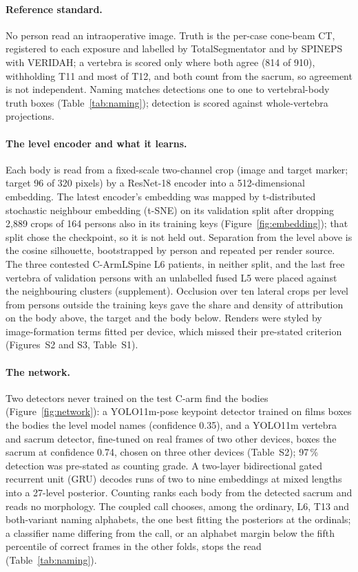 \paragraph{Reference standard.}
No person read an intraoperative image. Truth is the per-case cone-beam CT, registered to each exposure and
labelled by TotalSegmentator and by SPINEPS with VERIDAH; a vertebra is scored only where both agree (814 of
910), withholding T11 and most of T12, and both count from the sacrum, so agreement is not independent. Naming matches detections one to one to vertebral-body truth boxes
(Table~\ref{tab:naming}); detection is scored against whole-vertebra projections.

\paragraph{The level encoder and what it learns.}
Each body is read from a fixed-scale two-channel crop (image and target marker; target 96 of 320 pixels) by a
ResNet-18 encoder \citep{he2016} into a 512-dimensional embedding. The latest encoder's embedding was mapped by
t-distributed stochastic neighbour embedding (t-SNE) on its validation split after dropping 2,889 crops of 164
persons also in its training keys (Figure~\ref{fig:embedding}); that split chose the checkpoint, so it is not
held out. Separation from the level above is the cosine silhouette, bootstrapped by person and repeated per
render source. The three contested C-ArmLSpine L6 patients, in neither split, and the last free vertebra
of validation persons with an unlabelled fused L5 were placed against the neighbouring clusters (supplement).
Occlusion over ten lateral crops per level from persons outside the training keys gave the share and density
of attribution on the body above, the target and the body below. Renders were styled by image-formation terms
fitted per device, which missed their pre-stated criterion (Figures~S2 and S3, Table~S1).

\paragraph{The network.}
Two detectors never trained on the test C-arm find the bodies (Figure~\ref{fig:network}): a YOLO11m-pose keypoint
detector trained on films boxes the bodies the level model names (confidence 0.35), and a YOLO11m vertebra and
sacrum detector, fine-tuned on real frames of two other devices, boxes the sacrum at confidence 0.74, chosen on
three other devices (Table~S2); 97\,\% detection was pre-stated as counting grade. A two-layer
bidirectional gated recurrent unit (GRU) decodes runs of two to nine embeddings at mixed lengths into a 27-level
posterior. Counting ranks each body from the detected sacrum and reads no morphology. The coupled call chooses,
among the ordinary, L6, T13 and both-variant naming alphabets, the one best fitting the posteriors at the
ordinals; a classifier name differing from the call, or an alphabet margin below the fifth percentile of correct
frames in the other folds, stops the read (Table~\ref{tab:naming}).


